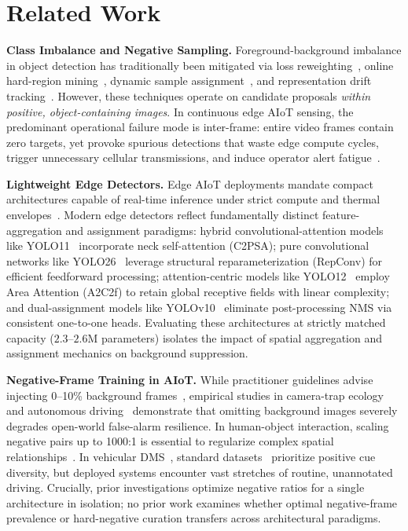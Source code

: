\documentclass[conference]{IEEEtran}
\begin{document}
\section{Related Work}
\label{sec:related}

\textbf{Class Imbalance and Negative Sampling.}
Foreground-background imbalance in object detection has traditionally been mitigated
via loss reweighting~\cite{b1}, online hard-region mining~\cite{b14,b4}, dynamic
sample assignment~\cite{b3}, and representation drift tracking~\cite{b2}. However,
these techniques operate on candidate proposals \textit{within positive, object-containing images}.
In continuous edge AIoT sensing, the predominant operational failure mode is
inter-frame: entire video frames contain zero targets, yet provoke spurious detections
that waste edge compute cycles, trigger unnecessary cellular transmissions, and induce
operator alert fatigue~\cite{b12,b13}.

\textbf{Lightweight Edge Detectors.}
Edge AIoT deployments mandate compact architectures capable of real-time inference
under strict compute and thermal envelopes~\cite{b15}. Modern edge detectors reflect
fundamentally distinct feature-aggregation and assignment paradigms: hybrid
convolutional-attention models like YOLO11~\cite{b9} incorporate neck self-attention
(C2PSA); pure convolutional networks like YOLO26~\cite{b10} leverage structural
reparameterization (RepConv) for efficient feedforward processing; attention-centric
models like YOLO12~\cite{b11} employ Area Attention (A2C2f) to retain global receptive
fields with linear complexity; and dual-assignment models like YOLOv10~\cite{b20}
eliminate post-processing NMS via consistent one-to-one heads.
Evaluating these architectures at strictly matched capacity ($2.3$--$2.6\text{M}$
parameters) isolates the impact of spatial aggregation and assignment mechanics on
background suppression.

\textbf{Negative-Frame Training in AIoT.}
While practitioner guidelines advise injecting 0--10\% background frames~\cite{b8},
empirical studies in camera-trap ecology~\cite{b5} and autonomous driving~\cite{b6}
demonstrate that omitting background images severely degrades open-world false-alarm
resilience. In human-object interaction, scaling negative pairs up to 1000:1 is
essential to regularize complex spatial relationships~\cite{b7}. In vehicular DMS~\cite{b12,b17}, standard datasets~\cite{b18,b19} prioritize
positive cue diversity, but deployed systems encounter vast stretches of routine,
unannotated driving. Crucially, prior investigations optimize negative ratios for a
single architecture in isolation; no prior work examines whether optimal negative-frame
prevalence or hard-negative curation transfers across architectural paradigms.
\end{document}
